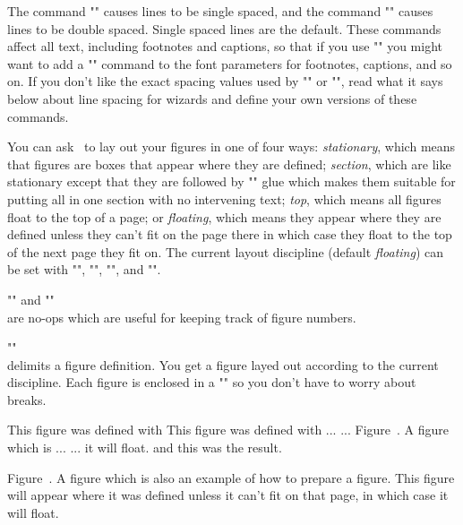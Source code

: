 The command \+"\singlespace"\+ causes lines to be single spaced,
and the command \+"\doublespace"\+ causes lines to be double
spaced.  Single spaced lines are the default.  These commands
affect all text, including footnotes and captions, so that if you
use "\doublespace" you might want to add a "\singlespace" command
to the font parameters for footnotes, captions, and so on.  If
you don't like the exact spacing values used by "\singlespace" or
"\doublespace", read what it says below about line spacing for
wizards and define your own versions of these commands.


You can ask \yTeX\ to lay out your figures in one of four ways:
{\it stationary}, which means that figures are boxes that appear
where they are defined; {\it section}, which are like stationary
except that they are followed by "\vfil" glue which makes them
suitable for putting all in one section with no intervening text;
{\it top}, which means all figures float to the top of a page; or
{\it floating}, which means they appear where they are defined
unless they can't fit on the page there in which case they float
to the top of the next page they fit on.  The current layout
discipline (default {\it floating}) can be set with
\+"\stationaryfigures"\+, \+"\sectionfigures"\+,
\+"\topfigures"\+, and \+"\floatingfigures"\+.

\begingab

\*\+"\figdef"\+ and \+"\figref"\+\\are no-ops which are useful
for keeping track of figure numbers.

\*\+"\beginfigure"\+\\delimits a figure definition.  You get a
figure layed out according to the current discipline.  Each
figure is enclosed in a "\vbox" so you don't have to worry about
breaks.

\begingroup \figurelinetrue
\beginfigure

\noindent This figure was defined with
\beginverb
\beginfigure
\noindent This figure was defined with ...
   ...
\begincaption
Figure~.  A figure which is ...
... it will float.
\endcaption
\endfigure
\endverb
and this was the result.

\begincaption
Figure~.  A figure which is also an example of how to
prepare a figure.  This figure will appear where it was defined
unless it can't fit on that page, in which case it will
float.
\endcaption

\endfigure
\endgroup

